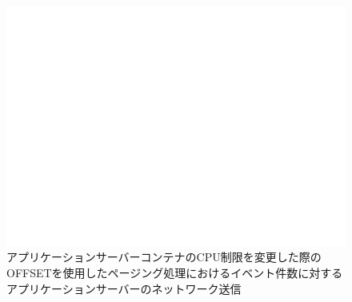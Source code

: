 \documentclass[../../../../../main]{subfiles}
\begin{document}
    \begin{figure}[H]
        \centering
        \includegraphics[width=12cm]{graph}
        \caption{アプリケーションサーバーコンテナのCPU制限を変更した際のOFFSETを使用したページング処理におけるイベント件数に対するアプリケーションサーバーのネットワーク送信}
        \label{fig:paging-offset-change-app-cpu-limit-app-net-out-app_1024-db_1_1024}
    \end{figure}
\end{document}
